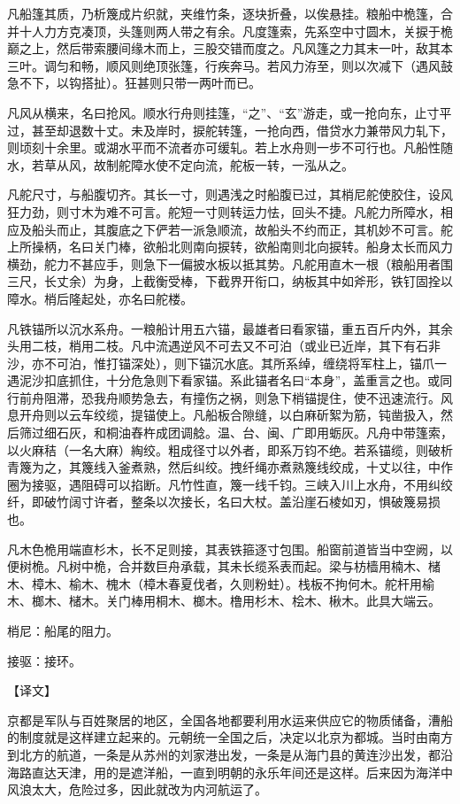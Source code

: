 \documentclass[12pt,UTF8]{ctexbook}
\begin{document}
凡船篷其质，乃析篾成片织就，夹维竹条，逐块折叠，以俟悬挂。粮船中桅篷，合并十人力方克凑顶，头篷则两人带之有余。凡度篷索，先系空中寸圆木，关捩于桅巅之上，然后带索腰间缘木而上，三股交错而度之。凡风篷之力其末一叶，敌其本三叶。调匀和畅，顺风则绝顶张篷，行疾奔马。若风力洊至，则以次减下（遇风鼓急不下，以钩搭扯）。狂甚则只带一两叶而已。

凡风从横来，名曰抢风。顺水行舟则挂篷，“之”、“玄”游走，或一抢向东，止寸平过，甚至却退数十丈。未及岸时，捩舵转篷，一抢向西，借贷水力兼带风力轧下，则顷刻十余里。或湖水平而不流者亦可缓轧。若上水舟则一步不可行也。凡船性随水，若草从风，故制舵障水使不定向流，舵板一转，一泓从之。

凡舵尺寸，与船腹切齐。其长一寸，则遇浅之时船腹已过，其梢尼舵使胶住，设风狂力劲，则寸木为难不可言。舵短一寸则转运力怯，回头不捷。凡舵力所障水，相应及船头而止，其腹底之下俨若一派急顺流，故船头不约而正，其机妙不可言。舵上所操柄，名曰关门棒，欲船北则南向捩转，欲船南则北向捩转。船身太长而风力横劲，舵力不甚应手，则急下一偏披水板以抵其势。凡舵用直木一根（粮船用者围三尺，长丈余）为身，上截衡受棒，下截界开衔口，纳板其中如斧形，铁钉固拴以障水。梢后隆起处，亦名曰舵楼。

凡铁锚所以沉水系舟。一粮船计用五六锚，最雄者曰看家锚，重五百斤内外，其余头用二枝，梢用二枝。凡中流遇逆风不可去又不可泊（或业已近岸，其下有石非沙，亦不可泊，惟打锚深处），则下锚沉水底。其所系绰，缠绕将军柱上，锚爪一遇泥沙扣底抓住，十分危急则下看家锚。系此锚者名曰“本身”，盖重言之也。或同行前舟阻滞，恐我舟顺势急去，有撞伤之祸，则急下梢锚提住，使不迅速流行。风息开舟则以云车绞缆，提锚使上。凡船板合隙缝，以白麻斫絮为筋，钝凿扱入，然后筛过细石灰，和桐油舂杵成团调艌。温、台、闽、广即用蛎灰。凡舟中带篷索，以火麻秸（一名大麻）綯绞。粗成径寸以外者，即系万钧不绝。若系锚缆，则破析青篾为之，其篾线入釜煮熟，然后纠绞。拽纤绳亦煮熟篾线绞成，十丈以往，中作圈为接驱，遇阻碍可以掐断。凡竹性直，篾一线千钧。三峡入川上水舟，不用纠绞纤，即破竹阔寸许者，整条以次接长，名曰大杖。盖沿崖石棱如刃，惧破篾易损也。

凡木色桅用端直杉木，长不足则接，其表铁箍逐寸包围。船窗前道皆当中空阙，以便树桅。凡树中桅，合并数巨舟承载，其未长缆系表而起。梁与枋樯用楠木、槠木、樟木、榆木、槐木（樟木春夏伐者，久则粉蛀）。栈板不拘何木。舵杆用榆木、榔木、槠木。关门棒用桐木、榔木。橹用杉木、桧木、楸木。此具大端云。

梢尼：船尾的阻力。

接驱：接环。

【译文】

京都是军队与百姓聚居的地区，全国各地都要利用水运来供应它的物质储备，漕船的制度就是这样建立起来的。元朝统一全国之后，决定以北京为都城。当时由南方到北方的航道，一条是从苏州的刘家港出发，一条是从海门县的黄连沙出发，都沿海路直达天津，用的是遮洋船，一直到明朝的永乐年间还是这样。后来因为海洋中风浪太大，危险过多，因此就改为内河航运了。
\end{document}
